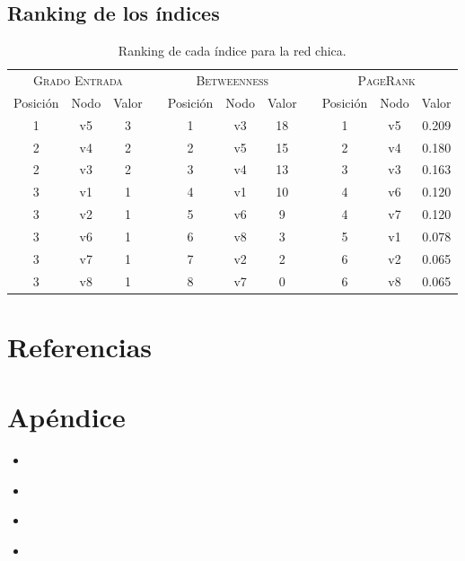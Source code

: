 \documentclass[letterpaper]{article}
\newcommand{\python}[2]{
    \begin{itemize}
        \item[]
    \end{itemize}
}
\begin{document}
\subsection{Ranking de los índices}
\begin{table}[H]
  \centering
  \renewcommand{\arraystretch}{1.1}
  \begin{tabular}{@{}ccccccccccc@{}}
    \toprule
       \multicolumn{3}{c}{\textsc{Grado Entrada}} & \phantom{abc} & \multicolumn{3}{c}{\textsc{Betweenness}} & \phantom{abc} & \multicolumn{3}{c}{\textsc{PageRank}}\\
       \cmidrule{1-3}\cmidrule{5-7}\cmidrule{9-11}
       Posición & Nodo & Valor & & Posición & Nodo & Valor & & Posición & Nodo & Valor\\
       \midrule
      1 & v5 & 3 &&  1 & v3 & 18 && 1 & v5 & 0.209 \\
      2 & v4 & 2 &&  2 & v5 & 15 && 2 & v4 & 0.180 \\
      2 & v3 & 2 &&  3 & v4 & 13 && 3 & v3 & 0.163 \\
      3 & v1 & 1 &&  4 & v1 & 10 && 4 & v6 & 0.120 \\
      3 & v2 & 1 &&  5 & v6 & 9  && 4 & v7 & 0.120 \\
      3 & v6 & 1 &&  6 & v8 & 3  && 5 & v1 & 0.078 \\
      3 & v7 & 1 &&  7 & v2 & 2  && 6 & v2 & 0.065 \\
      3 & v8 & 1 &&  8 & v7 & 0  && 6 & v8 & 0.065 \\
    \bottomrule
  \end{tabular}
  \caption{Ranking de cada índice para la red chica.}
\end{table}


\section{Referencias}
\section{Apéndice}

\python{codigos/p1.py}{p1.py}
\python{codigos/p2.py}{p2.py}
\python{codigos/p3.py}{p3.py}
\python{codigos/p4.py}{p4.py}
\end{document}
